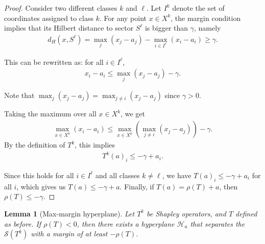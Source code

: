 \documentclass{article}
\newtheorem{lemma}[theorem]{Lemma}
\renewcommand{\geq}{\geqslant}
\renewcommand{\leq}{\leqslant}
\begin{document}
\begin{proof}
Consider two different classes $k$ and $\ell$. Let $I^k$ denote the set of coordinates assigned to class $k$. For any point $x \in X^k$, the margin condition implies that its Hilbert distance to sector $S^{\ell}$ is bigger than $\gamma$, namely
\begin{align}
d_H(x, S^{\ell}) = \max_j(x_j - a_j) - \max_{i \in I^{\ell}}(x_i - a_i) \geq \gamma.
\end{align}


This can be rewritten as: for all $i \in I^{\ell}$,
\begin{align}
x_i - a_i \leq \max_j(x_j - a_j) - \gamma.
\end{align}

Note that $ \max_j(x_j - a_j) = \max_{j\neq i}(x_j - a_j) $ since $\gamma >0$.

Taking the maximum over all $x \in X^k$, we get
\begin{align}
\max_{x \in X^k}(x_i - a_i) \leq \max_{x \in X^k}\left(\max_{j\neq i}(x_j - a_j)\right) - \gamma.
\end{align}
By the definition of $T^k$, this implies
\begin{align}
T^k(a)_i \leq -\gamma + a_i.
\end{align}

Since this holds for all $i \in I^{\ell}$ and all classes $k \neq \ell$, we have $T(a)_i \leq -\gamma + a_i$ for all $i$, which gives us $T(a) \leq -\gamma + a$.
Finally, if $T(a)=\rho(T)+a$, then $\rho(T)\le -\gamma$.
\end{proof}

\begin{lemma}[Max-margin hyperplane]\label{lemma:operator_to_hyperplane}
Let $T^k$ be Shapley operators, and $T$ defined as before. If $\rho(T) < 0$, then there exists a hyperplane $\mathcal{H}_a$ that separates the $\mathcal{S}(T^k)$ with a margin of at least $-\rho(T)$.
\end{lemma}
\end{document}
